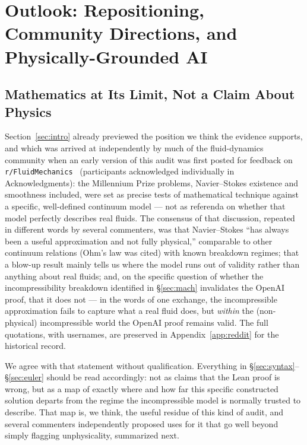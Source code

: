 \documentclass[11pt,a4paper]{article}
\begin{document}
\section{Outlook: Repositioning, Community Directions, and Physically-Grounded AI}
\label{sec:outlook}

\subsection{Mathematics at Its Limit, Not a Claim About Physics}

Section~\ref{sec:intro} already previewed the position we think the evidence supports, and which
was arrived at independently by much of the fluid-dynamics community when an early version of this
audit was first posted for feedback on \texttt{r/FluidMechanics}~\cite{RedditFluidMech2026}
(participants acknowledged individually in Acknowledgments): the Millennium Prize problems,
Navier--Stokes existence and smoothness included, were set as precise tests of mathematical
technique against a specific, well-defined continuum model --- not as referenda on whether that
model perfectly describes real fluids. The consensus of that discussion, repeated in different
words by several commenters, was that Navier--Stokes ``has always been a useful approximation and
not fully physical,'' comparable to other continuum relations (Ohm's law was cited) with known
breakdown regimes; that a blow-up result mainly tells us where the model runs out of validity rather
than anything about real fluids; and, on the specific question of whether the incompressibility
breakdown identified in \S\ref{sec:mach} invalidates the OpenAI proof, that it does not --- in the
words of one exchange, the incompressible approximation fails to capture what a real fluid does, but
\emph{within} the (non-physical) incompressible world the OpenAI proof remains valid. The full
quotations, with usernames, are preserved in Appendix~\ref{app:reddit} for the historical record.

We agree with that statement without qualification. Everything in
\S\ref{sec:syntax}--\S\ref{sec:euler} should be read accordingly: not as claims that the Lean proof
is wrong, but as a map of exactly where and how far this specific constructed solution departs from
the regime the incompressible model is normally trusted to describe. That map is, we think, the
useful residue of this kind of audit, and several commenters independently proposed uses for it
that go well beyond simply flagging unphysicality, summarized next.
\end{document}

